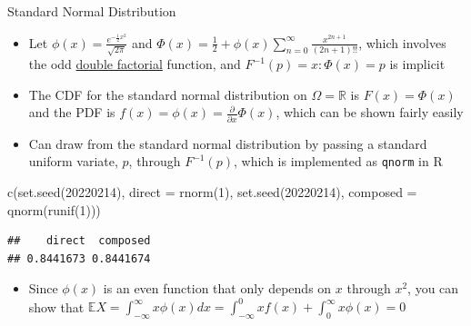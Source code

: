 \documentclass[
  ignorenonframetext,
]{beamer}
\newenvironment{Shaded}{\begin{snugshade}}{\end{snugshade}}
\newcommand{\AttributeTok}[1]{\textcolor[rgb]{0.77,0.63,0.00}{#1}}
\newcommand{\DecValTok}[1]{\textcolor[rgb]{0.00,0.00,0.81}{#1}}
\newcommand{\FunctionTok}[1]{\textcolor[rgb]{0.00,0.00,0.00}{#1}}
\newcommand{\NormalTok}[1]{#1}
\providecommand{\tightlist}{%
  \setlength{\itemsep}{0pt}\setlength{\parskip}{0pt}}
\begin{document}
\begin{frame}[fragile]{Standard Normal Distribution}
\protect\hypertarget{standard-normal-distribution}{}
\begin{itemize}
\tightlist
\item
  Let \(\phi\left(x\right) = \frac{e^{-\frac{1}{2}x^2}}{\sqrt{2\pi}}\)
  and
  \(\Phi\left(x\right) = \frac{1}{2} + \phi\left(x\right) \sum_{n = 0}^\infty \frac{x^{2n + 1}}{\left(2n + 1\right)!!}\),
  which involves the odd
  \href{https://en.wikipedia.org/wiki/Double_factorial}{double
  factorial} function, and
  \(F^{-1}\left(p\right) = x: \Phi\left(x\right) = p\) is implicit
\item
  The CDF for the standard normal distribution on
  \(\Omega = \mathbb{R}\) is \(F\left(x\right) = \Phi\left(x\right)\)
  and the PDF is
  \(f\left(x\right) = \phi\left(x\right) = \frac{\partial}{\partial x} \Phi\left(x\right)\),
  which can be shown fairly easily
\item
  Can draw from the standard normal distribution by passing a standard
  uniform variate, \(p\), through \(F^{-1}\left(p\right)\), which is
  implemented as \texttt{qnorm} in R
\end{itemize}

\begin{Shaded}
\begin{Highlighting}[]
\FunctionTok{c}\NormalTok{(}\FunctionTok{set.seed}\NormalTok{(}\DecValTok{20220214}\NormalTok{), }\AttributeTok{direct =} \FunctionTok{rnorm}\NormalTok{(}\DecValTok{1}\NormalTok{), }\FunctionTok{set.seed}\NormalTok{(}\DecValTok{20220214}\NormalTok{), }\AttributeTok{composed =} \FunctionTok{qnorm}\NormalTok{(}\FunctionTok{runif}\NormalTok{(}\DecValTok{1}\NormalTok{)))}
\end{Highlighting}
\end{Shaded}

\begin{verbatim}
##    direct  composed 
## 0.8441673 0.8441674
\end{verbatim}

\begin{itemize}
\tightlist
\item
  Since \(\phi\left(x\right)\) is an even function that only depends on
  \(x\) through \(x^2\), you can show that
  \(\mathbb{E}X = \int_{-\infty}^\infty x \phi\left(x\right) dx = \int_{-\infty}^0 x f\left(x\right) + \int_{0}^\infty x \phi\left(x\right) = 0\)
\end{itemize}
\end{frame}
\end{document}
